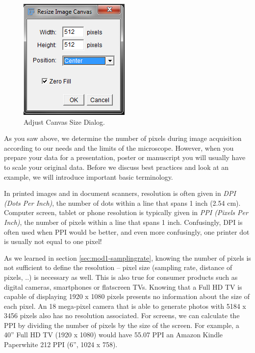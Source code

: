 \begin{figure}[!ht]
	\captionsetup{justification=centering}
	\centering
		\includegraphics{mod1/figures/adjust-canvas-dialog.png}
		\caption{Adjust Canvas Size Dialog.}\label{fig:adjust-canvas-dialog}
\end{figure}

As you saw above, we determine the number of pixels during image acquisition according to our needs and the limits of the microscope. However, when you prepare your data for a presentation, poster or manuscript you will usually have to scale your original data. Before we discuss best practices and look at an example, we will introduce important basic terminology.


In printed images and in document scanners, resolution is often given in \emph{DPI (Dots Per Inch)}, the number of dots within a line that spans 1 inch (2.54 cm). Computer screen, tablet or phone resolution is typically given in \emph{PPI (Pixels Per Inch)}, the number of pixels within a line that spans 1 inch. Confusingly, DPI is often used when PPI would be better, and even more confusingly, one printer dot is usually not equal to one pixel! 

As we learned in section \ref{sec:mod1-samplingrate}, knowing the
number of pixels is not sufficient to define the resolution -- pixel
size (sampling rate, distance of pixels, ..) is necessary as
well. This is also true for consumer products such as digital cameras,
smartphones or flatscreen TVs. Knowing that a Full HD TV is capable of
displaying 1920 x 1080 pixels presents no information about the size
of each pixel. An 18 mega-pixel camera that is able to generate photos
with 5184 x 3456 pixels also has no resolution associated. For
screens, we can calculate the PPI by dividing the number of pixels by
the size of the screen. For example, a 40'' Full HD TV (1920 x 1080) would have 55.07 PPI an Amazon Kindle Paperwhite 212 PPI (6'', 1024 x 758). 

